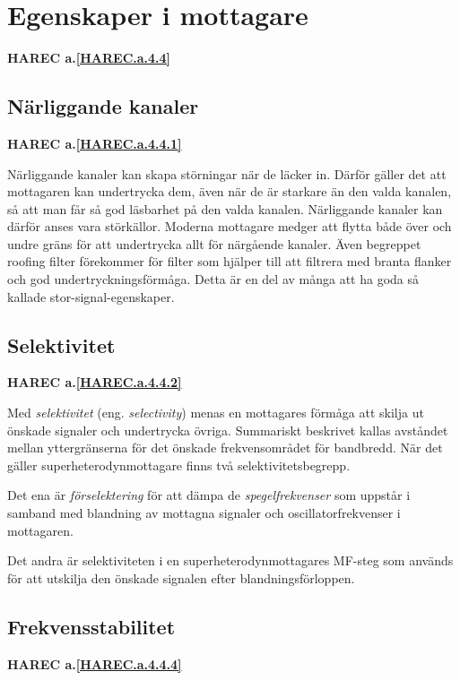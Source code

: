 \section{Egenskaper i mottagare}
\textbf{HAREC a.\ref{HAREC.a.4.4}\label{myHAREC.a.4.4}}

\subsection{Närliggande kanaler}
\textbf{HAREC a.\ref{HAREC.a.4.4.1}\label{myHAREC.a.4.4.1}}

Närliggande kanaler kan skapa störningar när de läcker in.
Därför gäller det att mottagaren kan undertrycka dem, även när de är starkare
än den valda kanalen, så att man får så god läsbarhet på den valda kanalen.
Närliggande kanaler kan därför anses vara störkällor.
Moderna mottagare medger att flytta både över och undre gräns för att
undertrycka allt för närgående kanaler.
Även begreppet roofing filter förekommer för filter som hjälper till att
filtrera med branta flanker och god undertryckningsförmåga.
Detta är en del av många att ha goda så kallade stor-signal-egenskaper.

\subsection{Selektivitet}
\textbf{HAREC a.\ref{HAREC.a.4.4.2}\label{myHAREC.a.4.4.2}}

Med \emph{selektivitet} (eng. \emph{selectivity}) menas en mottagares förmåga
att skilja ut önskade signaler och undertrycka övriga.
Summariskt beskrivet kallas avståndet mellan yttergränserna för det önskade
frekvensområdet för bandbredd.
När det gäller superheterodynmottagare finns två selektivitetsbegrepp.

Det ena är \emph{förselektering} för att dämpa de \emph{spegelfrekvenser} som
uppstår i samband med blandning av mottagna signaler och oscillatorfrekvenser i
mottagaren.

Det andra är selektiviteten i en superheterodynmottagares MF-steg som används
för att utskilja den önskade signalen efter blandningsförloppen.

\subsection{Frekvensstabilitet}
\textbf{HAREC a.\ref{HAREC.a.4.4.4}\label{myHAREC.a.4.4.4}}

